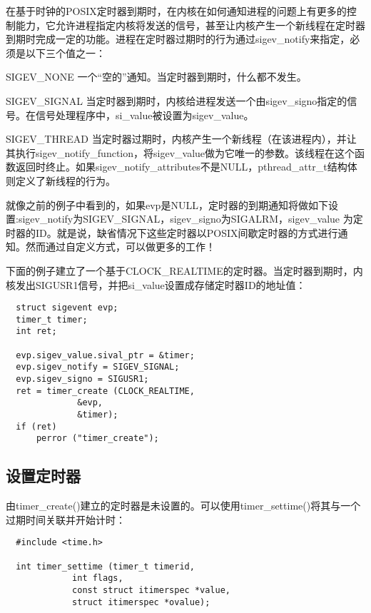 在基于时钟的POSIX定时器到期时，在内核在如何通知进程的问题上有更多的控制能力，它允许进程指定内核将发送的信号，甚至让内核产生一个新线程在定时器到期时完成一定的功能。进程在定时器过期时的行为通过sigev\_notify来指定，必须是以下三个值之一： 

\begin{eqlist*}
\item [SIGEV\_NONE]
一个“空的”通知。当定时器到期时，什么都不发生。
\item [SIGEV\_SIGNAL]
当定时器到期时，内核给进程发送一个由sigev\_signo指定的信号。在信号处理程序中，si\_value被设置为sigev\_value。 
 \item [SIGEV\_THREAD]
当定时器过期时，内核产生一个新线程（在该进程内），并让其执行sigev\_notify\_function，将sigev\_value做为它唯一的参数。该线程在这个函数返回时终止。如果sigev\_notify\_attributes不是NULL，pthread\_attr\_t结构体则定义了新线程的行为。 
\end{eqlist*}

就像之前的例子中看到的，如果evp是NULL，定时器的到期通知将做如下设置:sigev\_notify为SIGEV\_SIGNAL，sigev\_signo为SIGALRM，sigev\_value 为定时器的ID。就是说，缺省情况下这些定时器以POSIX间歇定时器的方式进行通知。然而通过自定义方式，可以做更多的工作！ 

下面的例子建立了一个基于CLOCK\_REALTIME的定时器。当定时器到期时，内核发出SIGUSR1信号，并把si\_value设置成存储定时器ID的地址值： 

\begin{lstlisting}
  struct sigevent evp;
  timer_t timer;
  int ret;

  evp.sigev_value.sival_ptr = &timer;
  evp.sigev_notify = SIGEV_SIGNAL;
  evp.sigev_signo = SIGUSR1;
  ret = timer_create (CLOCK_REALTIME,
		      &evp,
		      &timer);
  if (ret)
      perror ("timer_create");
\end{lstlisting}

\subsection{设置定时器}

由timer\_create()建立的定时器是未设置的。可以使用timer\_settime()将其与一个过期时间关联并开始计时： 

\begin{lstlisting}
  #include <time.h>

  int timer_settime (timer_t timerid,
		     int flags,
		     const struct itimerspec *value,
		     struct itimerspec *ovalue);
\end{lstlisting}

